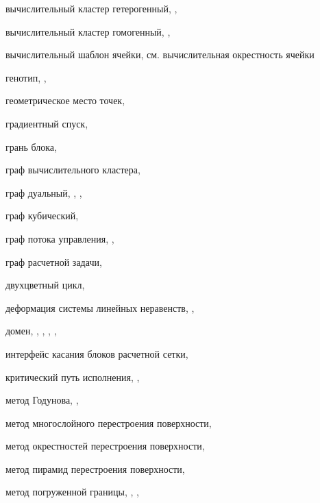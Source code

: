 вычислительный кластер гетерогенный, \pageref{term:cluster_getero}, \pageref{term:cluster_getero2}

вычислительный кластер гомогенный, \pageref{term:cluster_gomo}, \pageref{term:cluster_gomo2}

вычислительный шаблон ячейки, см. вычислительная окрестность ячейки

генотип, \pageref{term:genotype}, \pageref{term:genotype2}

геометрическое место точек, \pageref{term:gmt}

градиентный спуск, \pageref{term:gradient_spusk}

грань блока, \pageref{term:block_facet}

граф вычислительного кластера, \pageref{term:graph_cluster}

граф дуальный, \pageref{term:dual_graph}, \pageref{term:dual_graph2}, \pageref{term:dual_graph3}

граф кубический, \pageref{term:graph_cubic}

граф потока управления, \pageref{term:graph_cfg}, \pageref{term:graph_cfg2}

граф расчетной задачи, \pageref{term:graph_task}

двухцветный цикл, \pageref{term:bicolor_cycle}

деформация системы линейных неравенств, \pageref{term:deform_sys_lin_neravenstv}, \pageref{term:deform_sys_lin_neravenstv2}

домен, \pageref{term:domain}, \pageref{term:domain2}, \pageref{term:domain3}, \pageref{term:domain4}, \pageref{term:domain5}

интерфейс касания блоков расчетной сетки, \pageref{term:block_interface}

критический путь исполнения, \pageref{term:critical_path}, \pageref{term:critical_path2}

метод Годунова, \pageref{term:godunov_method}, \pageref{term:godunov_method2}

метод многослойного перестроения поверхности, \pageref{term:method_remesh_multi}

метод окрестностей перестроения поверхности, \pageref{term:method_remesh_okr}

метод пирамид перестроения поверхности, \pageref{term:method_remesh_pyramid}

метод погруженной границы, \pageref{term:immersed_boundary_method}, \pageref{term:immersed_boundary_method2}, \pageref{term:immersed_boundary_method3}

